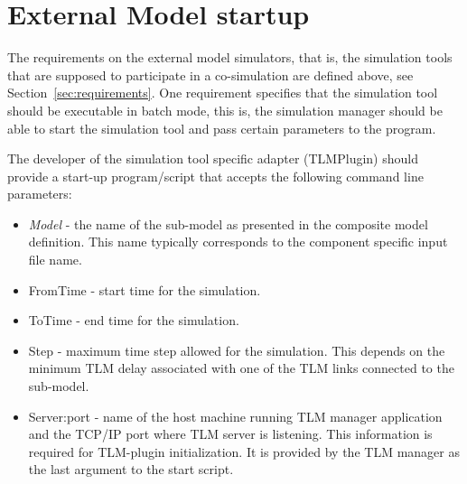 \section{External Model startup}
\label{xmodel-startup}
The requirements on the external model simulators, that is, the simulation tools that are supposed to participate in a co-simulation are defined above, see Section~\ref{sec:requirements}. 
One requirement specifies that the simulation tool should be executable in batch mode, this is, the simulation manager should be able to start the simulation tool and pass certain parameters to the program.

The developer of the simulation tool specific adapter (TLMPlugin) should provide a start-up program/script that accepts the following command line parameters:
\begin{itemize}
\item \emph{Model} - the name of the sub-model as presented in the composite model definition. 
This name typically corresponds to the component specific input file name.
\item {FromTime} - start time for the simulation.
\item {ToTime} - end time for the simulation.
\item {Step} - maximum time step allowed for the simulation. This depends on the minimum TLM delay associated with one of the TLM links connected to the sub-model.
\item {Server:port} - name of the host machine running TLM manager application and the TCP/IP port where TLM server is listening. 
This information is required for TLM-plugin initialization. 
It is provided by the TLM manager as the last argument to the start script.
\end{itemize}

